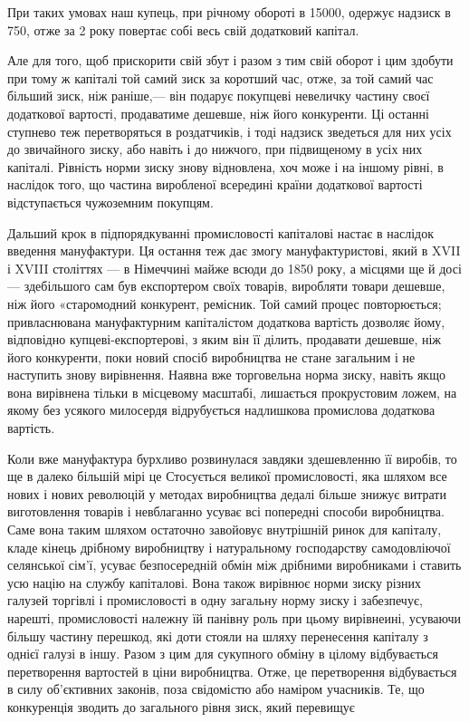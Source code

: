 \parcont{}  %
При таких умовах наш купець, при річному
обороті в 15000, одержує надзиск в 750, отже за 2 року повертає собі весь свій додатковий капітал.

Але для того, щоб
прискорити свій збут і разом з тим свій оборот і цим здобути при тому ж капіталі той самий зиск за коротший час, отже, за
той самий час більший зиск, ніж раніше,— він подарує покупцеві невеличку частину своєї додаткової вартості, продаватиме
дешевше, ніж його конкуренти.
Ці останні ступнево теж перетворяться в роздатчиків, і тоді надзиск зведеться для них усіх до звичайного зиску, або навіть і
до нижчого, при підвищеному в усіх них капіталі. Рівність норми зиску знову відновлена, хоч може і на іншому рівні, в
наслідок того, що частина виробленої всередині країни додаткової вартості відступається чужоземним покупцям.

Дальший крок в
підпорядкуванні промисловості капіталові настає в наслідок введення мануфактури. Ця остання теж дає змогу мануфактуристові,
який в XVII і XVIII століттях — в Німеччині майже всюди до 1850 року, а місцями ще й досі — здебільшого сам був експортером
своїх товарів, виробляти товари дешевше, ніж його «старомодний конкурент, ремісник. Той самий процес повторюється;
привласнювана мануфактурним капіталістом додаткова вартість дозволяє йому, відповідно купцеві-експортерові, з яким він її
ділить, продавати дешевше, ніж його конкуренти, поки новий спосіб виробництва не стане загальним і не наступить знову
вирівнення. Наявна вже торговельна норма зиску, навіть якщо вона вирівнена тільки в місцевому масштабі, лишається
прокрустовим ложем, на якому без усякого милосердя відрубується надлишкова промислова додаткова вартість.

Коли вже мануфактура бурхливо розвинулася завдяки здешевленню її виробів, то ще в далеко більшій мірі це Стосується великої
промисловості, яка шляхом все нових і нових революцій у методах виробництва дедалі більше знижує витрати виготовлення
товарів і невблаганно усуває всі попередні способи виробництва. Саме вона таким шляхом остаточно завойовує внутрішній ринок
для капіталу, кладе кінець дрібному виробництву і натуральному господарству самодовліючої селянської сім’ї, усуває
безпосередній обмін між дрібними виробниками і ставить усю націю на службу капіталові. Вона також вирівнює норми зиску
різних галузей торгівлі і промисловості в одну загальну норму зиску і забезпечує, нарешті, промисловості належну їй панівну
роль при цьому вирівнеині, усуваючи більшу частину перешкод, які доти стояли на шляху перенесення капіталу з однієї галузі в
іншу. Разом з цим для сукупного обміну в цілому відбувається перетворення вартостей в ціни виробництва. Отже, це
перетворення відбувається в силу об’єктивних законів, поза свідомістю або наміром учасників. Те, що конкуренція зводить до
загального рівня зиск, який перевищує
\parbreak{}  %
